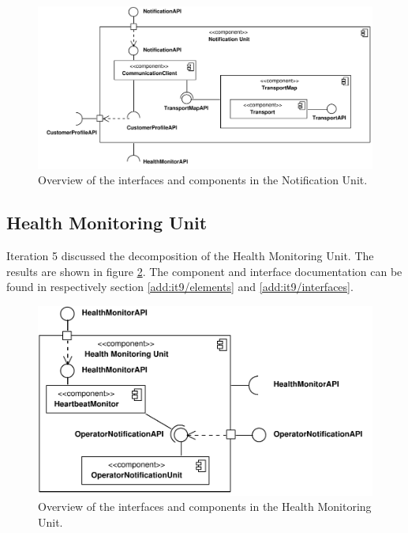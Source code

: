 \begin{figure}[H]
	\begin{centering}
		\includegraphics[width=\textwidth]{figs/add-it8-interfaces.pdf}
		\caption{Overview of the interfaces and components in the Notification Unit.}
		\label{fig:final-architecture/it8}
	\end{centering}
\end{figure}

\subsection{Health Monitoring Unit}

\npar Iteration 5 discussed the decomposition of the Health Monitoring Unit. The
results are shown in figure \ref{fig:final-architecture/it9}. The component and
interface documentation can be found in respectively section
\ref{add:it9/elements} and \ref{add:it9/interfaces}.

\begin{figure}[H]
	\begin{centering}
		\includegraphics[width=\textwidth]{figs/add-it9-interfaces.pdf}
		\caption{Overview of the interfaces and components in the Health Monitoring
		Unit.}
		\label{fig:final-architecture/it9}
	\end{centering}
\end{figure}

